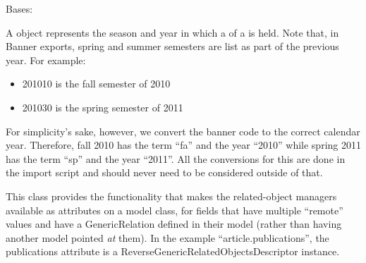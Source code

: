 \documentclass[letterpaper,10pt,english]{sphinxmanual}
\begin{document}
\begin{fulllineitems}
\label{generated/apps.profiles.models:apps.profiles.models.Semester}
Bases: {\hyperref[generated/apps.profiles.models:apps.profiles.models.BaseModel]{}}

A  object represents the season and year in which a 
of a  is held.  Note that, in Banner exports, spring and summer
semesters are list as part of the previous year.  For example:
\begin{itemize}
\item {} 
201010 is the fall semester of 2010

\item {} 
201030 is the spring semester of 2011

\end{itemize}

For simplicity's sake, however, we convert the banner code to the correct
calendar year.  Therefore, fall 2010 has the term ``fa'' and the year ``2010''
while spring 2011 has the term ``sp'' and the year ``2011''.  All the conversions
for this are done in the import script and should never need to be
considered outside of that.


\begin{fulllineitems}
\label{generated/apps.profiles.models:apps.profiles.models.Semester.unit_permissions}
This class provides the functionality that makes the related-object
managers available as attributes on a model class, for fields that have
multiple ``remote'' values and have a GenericRelation defined in their model
(rather than having another model pointed \emph{at} them). In the example
``article.publications'', the publications attribute is a
ReverseGenericRelatedObjectsDescriptor instance.

\end{fulllineitems}


\end{fulllineitems}


\end{document}
